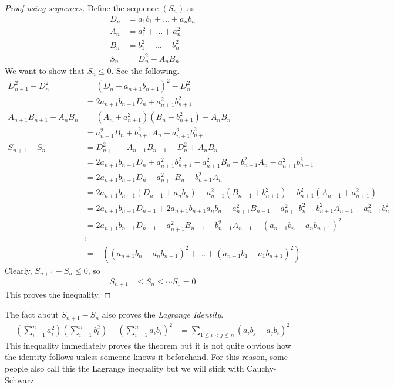 \documentclass{subfile}
\begin{document}
		\begin{proof}[Proof using sequences]
			Define the sequence $(S_n)$ as
				\begin{align*}
					D_n
						& = a_1b_1+\ldots+a_nb_n\\
					A_n
						& = a_1^2+\ldots+a_n^2\\
					B_n
						& = b_1^2+\ldots+b_n^2\\
					S_n
						& = D_n^2-A_nB_n
				\end{align*}
			We want to show that $S_n\leq0$. See the following.
				\begin{align*}
					D_{n+1}^2-D_n^2
						& = (D_n+a_{n+1}b_{n+1})^2-D_n^2\\
						& = 2a_{n+1}b_{n+1}D_n+a_{n+1}^2b_{n+1}^2\\
					A_{n+1}B_{n+1}-A_nB_n
						& = (A_n+a_{n+1}^2)(B_n+b_{n+1}^2)-A_nB_n\\
						& = a_{n+1}^2B_n+b_{n+1}^2A_n+a_{n+1}^2b_{n+1}^2\\
					S_{n+1}-S_n
						& = D_{n+1}^2-A_{n+1}B_{n+1}-D_n^2+A_nB_n\\
						& = 2a_{n+1}b_{n+1}D_n+a_{n+1}^2b_{n+1}^2-a_{n+1}^2B_n-b_{n+1}^2A_n-a_{n+1}^2b_{n+1}^2\\
						& = 2a_{n+1}b_{n+1}D_n-a_{n+1}^2B_n-b_{n+1}^2A_n\\
						& = 2a_{n+1}b_{n+1}(D_{n-1}+a_nb_n)-a_{n+1}^2(B_{n-1}+b_{n+1}^2)-b_{n+1}^2(A_{n-1}+a_{n+1}^2)\\
						& = 2a_{n+1}b_{n+1}D_{n-1}+2a_{n+1}b_{n+1}a_nb_n-a_{n+1}^2B_{n-1}-a_{n+1}^2b_{n}^2-b_{n+1}^2A_{n-1}-a_{n+1}^2b_{n}^2\\
						& = 2a_{n+1}b_{n+1}D_{n-1}-a_{n+1}^2B_{n-1}-b_{n+1}^2A_{n-1}-(a_{n+1}b_n-a_{n}b_{n+1})^2\\
						& \vdots\\
						& = -\left((a_{n+1}b_n-a_nb_{n+1})^2+\ldots+(a_{n+1}b_1-a_1b_{n+1})^2\right)
				\end{align*}
			Clearly, $S_{n+1}-S_n\leq0$, so
				\begin{align*}
					S_{n+1}
						& \leq S_n\leq\cdots S_1=0
				\end{align*}
			This proves the inequality.
		\end{proof}
	The fact about $S_{n+1}-S_n$ also proves the \emph{Lagrange Identity}.
		\begin{align*}
			\left(\sum_{i=1}^na_i^2\right)\left(\sum_{i=1}^nb_i^2\right)-\left(\sum_{i=1}^na_ib_i\right)^2
				& = \sum_{1\leq i< j\leq n}(a_ib_j-a_jb_i)^2
		\end{align*}
	This inequality immediately proves the theorem but it is not quite obvious how the identity follows unless someone knows it beforehand. For this reason, some people also call this the Lagrange inequality but we will stick with Cauchy-Schwarz. %
	
\end{document}
